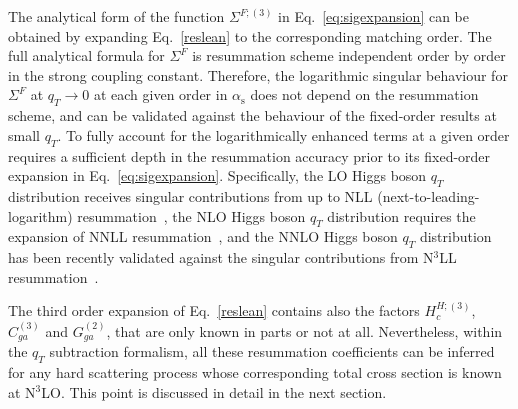 \documentclass[12pt]{article}
\DeclareRobustCommand{\as}{\ensuremath{\alpha_{\mathrm{s}}}}
\DeclareRobustCommand{\qt}{q_T}
\begin{document}
The analytical form of the function $\Sigma^{F;(3)}$ in Eq.~\eqref{eq:sigexpansion} can be obtained by expanding Eq.~\eqref{reslean} to the corresponding matching order. The full analytical formula for $\Sigma^{F}$ is resummation scheme independent order by order in the strong coupling constant. Therefore, the logarithmic singular behaviour for $\Sigma^{F}$ at $\qt\rightarrow 0$ at 
each given order in $\as$ does not depend on the 
resummation scheme, and can be validated against the behaviour of the fixed-order results at small $\qt$. To fully 
account for the logarithmically enhanced terms at a given order requires a sufficient depth in the resummation accuracy prior to 
its fixed-order expansion in Eq.~\eqref{eq:sigexpansion}. Specifically, the LO Higgs boson $\qt$ distribution receives singular contributions from up to NLL (next-to-leading-logarithm) resummation~\cite{Catani:1988vd,Kauffman:1991cx}, the NLO Higgs boson $\qt$ distribution requires the expansion of NNLL resummation~\cite{deFlorian:2001zd,deFlorian:2000pr,Becher:2012yn,Neill:2015roa}, and the NNLO Higgs boson $\qt$ distribution has been recently validated against the singular contributions from N$^3$LL resummation~\cite{Chen:2018pzu,Bizon:2018foh}. 

The third order expansion of Eq.~\eqref{reslean} contains also the factors $H^{H;(3)}_{c}$, $C^{(3)}_{ga}$ and $G^{(2)}_{ga}$,  that are only known in parts or not at all. Nevertheless, within the $\qt$ subtraction  formalism, all these resummation coefficients can be inferred for any hard scattering process whose corresponding total cross section is known at N$^{3}$LO. This point is discussed in detail in the next section.


\setcounter{footnote}{0}
\end{document}
